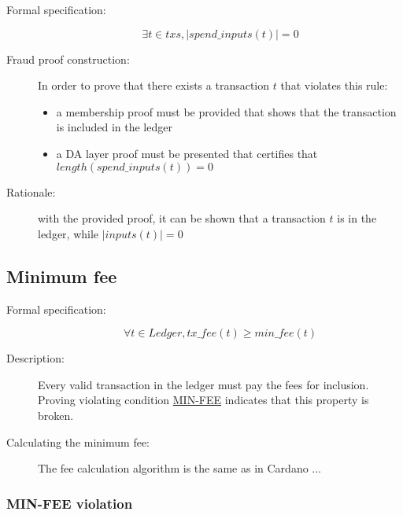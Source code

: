 \documentclass[../midgard.tex]{subfiles}
\begin{document}
\begin{description}

\item[Formal specification:]
\begin{equation*}
    \exists t \in txs, |spend\_inputs(t)| = 0
\end{equation*}

\item[Fraud proof construction:] In order to prove that there exists a transaction $t$ that violates this rule:
\begin{itemize}
    \item a membership proof must be provided that shows that the transaction is included in the ledger
    \item a DA layer proof must be presented that certifies that $length(spend\_inputs(t)) = 0$ \todo
\end{itemize}

\item[Rationale:] with the provided proof, it can be shown that a transaction $t$ is in the ledger, while $|inputs(t)| = 0$

\end{description}

\subsection{Minimum fee}
\label{rule:minimum-fee}

\begin{description}

\item[Formal specification:]
\begin{equation*}
    \forall t \in Ledger, tx\_fee(t) \geq min\_fee(t)
\end{equation*}

\item[Description:] Every valid transaction in the ledger must pay the fees for inclusion.
  Proving violating condition \hyperref[violation:MIN-FEE]{MIN-FEE} indicates that this property is broken.

\item[Calculating the minimum fee:] The fee calculation algorithm is the same as in Cardano ... \todo

\end{description}

\subsubsection{MIN-FEE violation}
\label{violation:MIN-FEE}
\end{document}
